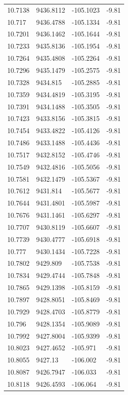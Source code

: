\begin{table}[H]
\begin{tabular}{llll}
10.7138 & 9436.8112 & -105.1023 & -9.81 \\
10.717 & 9436.4788 & -105.1334 & -9.81 \\
10.7201 & 9436.1462 & -105.1644 & -9.81 \\
10.7233 & 9435.8136 & -105.1954 & -9.81 \\
10.7264 & 9435.4808 & -105.2264 & -9.81 \\
10.7296 & 9435.1479 & -105.2575 & -9.81 \\
10.7328 & 9434.815 & -105.2885 & -9.81 \\
10.7359 & 9434.4819 & -105.3195 & -9.81 \\
10.7391 & 9434.1488 & -105.3505 & -9.81 \\
10.7423 & 9433.8156 & -105.3815 & -9.81 \\
10.7454 & 9433.4822 & -105.4126 & -9.81 \\
10.7486 & 9433.1488 & -105.4436 & -9.81 \\
10.7517 & 9432.8152 & -105.4746 & -9.81 \\
10.7549 & 9432.4816 & -105.5056 & -9.81 \\
10.7581 & 9432.1479 & -105.5367 & -9.81 \\
10.7612 & 9431.814 & -105.5677 & -9.81 \\
10.7644 & 9431.4801 & -105.5987 & -9.81 \\
10.7676 & 9431.1461 & -105.6297 & -9.81 \\
10.7707 & 9430.8119 & -105.6607 & -9.81 \\
10.7739 & 9430.4777 & -105.6918 & -9.81 \\
10.777 & 9430.1434 & -105.7228 & -9.81 \\
10.7802 & 9429.809 & -105.7538 & -9.81 \\
10.7834 & 9429.4744 & -105.7848 & -9.81 \\
10.7865 & 9429.1398 & -105.8159 & -9.81 \\
10.7897 & 9428.8051 & -105.8469 & -9.81 \\
10.7929 & 9428.4703 & -105.8779 & -9.81 \\
10.796 & 9428.1354 & -105.9089 & -9.81 \\
10.7992 & 9427.8004 & -105.9399 & -9.81 \\
10.8023 & 9427.4652 & -105.971 & -9.81 \\
10.8055 & 9427.13 & -106.002 & -9.81 \\
10.8087 & 9426.7947 & -106.033 & -9.81 \\
10.8118 & 9426.4593 & -106.064 & -9.81 \\

\end{tabular}
\end{table}
